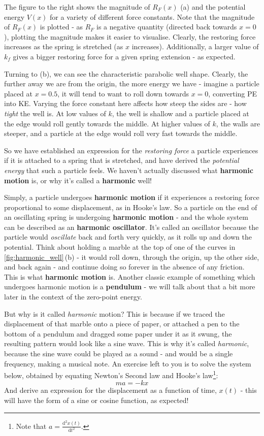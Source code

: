 \documentclass{memoir}[11pt,oneside,a4paper,openany]
\newcommand{\dd}{\ensuremath{\mathrm{d}}}
\begin{document}
The figure to the right shows the magnitude of $R_F(x)$ (a) and the potential energy $V(x)$ for a variety of different force constants. Note that the magnitude of $R_F(x)$ is plotted - as $R_F$ is a negative quantity (directed back towards $x=0$), plotting the magnitude makes it easier to visualise. Clearly, the restoring force increases as the spring is stretched (as $x$ increases). Additionally, a larger value of $k_f$ gives a bigger restoring force for a given spring extension - as expected. 

Turning to (b), we can see the characteristic parabolic well shape. Clearly, the further away we are from the origin, the more energy we have - imagine a particle placed at $x=0.5$, it will tend to want to roll down towards $x=0$, converting PE into KE. Varying the force constant here affects how steep the sides are - how \emph{tight} the well is. At low values of $k$, the well is shallow and a particle placed at the edge would roll gently towards the middle. At higher values of $k$, the walls are steeper, and a particle at the edge would roll very fast towards the middle. 

So we have established an expression for the \emph{restoring force} a particle experiences if it is attached to a spring that is stretched, and have derived the \emph{potential energy} that such a particle feels. We haven't actually discussed what \textbf{harmonic motion} is, or why it's called a \textbf{harmonic} well!

Simply, a particle undergoes \textbf{harmonic motion} if it experiences a restoring force proportional to some displacement, as in Hooke's law. So a particle on the end of an oscillating spring is undergoing \textbf{harmonic motion} - and the whole system can be described as an \textbf{harmonic oscillator}. It's called an oscillator because the particle would \emph{oscillate} back and forth very quickly, as it rolls up and down the potential. Think about holding a marble at the top of one of the curves in \autoref{fig:harmonic_well}\,(b) - it would roll down, through the origin, up the other side, and back again - and continue doing so forever in the absence of any friction. This is what \textbf{harmonic motion} is. Another classic example of something which undergoes harmonic motion is a \textbf{pendulum} - we will talk about that a bit more later in the context of the zero-point energy. 

But why is it called \emph{harmonic} motion? This is because if we traced the displacement of that marble onto a piece of paper, or attached a pen to the bottom of a pendulum and dragged some paper under it as it swung, the resulting pattern would look like a sine wave. This is why it's called \emph{harmonic}, because the sine wave could be played as a sound - and would be a single frequency, making a musical note. An exercise left to you is to solve the system below, obtained by equating Newton's Second law and Hooke's law\footnote{Note that $a = \frac{\dd^2x(t)}{\dd t^2}$.}:
\begin{equation}
	ma = -kx
\end{equation}
And derive an expression for the displacement as a function of time, $x(t)$ - this will have the form of a sine or cosine function, as expected! 
\end{document}

